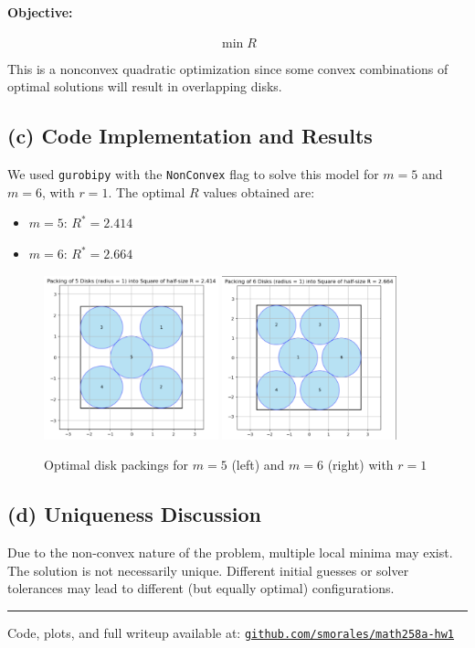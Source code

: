 \documentclass[11pt]{article}
\begin{document}
\paragraph{Objective:}
\[
\min R
\]

This is a nonconvex quadratic optimization since some convex combinations of optimal solutions will result in overlapping disks.

\subsection*{(c) Code Implementation and Results}

We used \texttt{gurobipy} with the \texttt{NonConvex} flag to solve this model for $m=5$ and $m=6$, with $r=1$. The optimal $R$ values obtained are:

\begin{itemize}
    \item $m=5$: $R^* = 2.414$
    \item $m=6$: $R^* = 2.664$
\end{itemize}

\begin{figure}[h!]
    \centering
    \includegraphics[width=0.45\textwidth]{packing_5.png}
    \includegraphics[width=0.45\textwidth]{packing_6.png}
    \caption{Optimal disk packings for $m=5$ (left) and $m=6$ (right) with $r=1$}
\end{figure}

\subsection*{(d) Uniqueness Discussion}

Due to the non-convex nature of the problem, multiple local minima may exist. The solution is not necessarily unique. Different initial guesses or solver tolerances may lead to different (but equally optimal) configurations.

\vspace{1em}
\hrule
\vspace{1em}
\noindent Code, plots, and full writeup available at:  
\texttt{\href{https://github.com/smorales/math258a-hw1}{github.com/smorales/math258a-hw1}}
\end{document}
